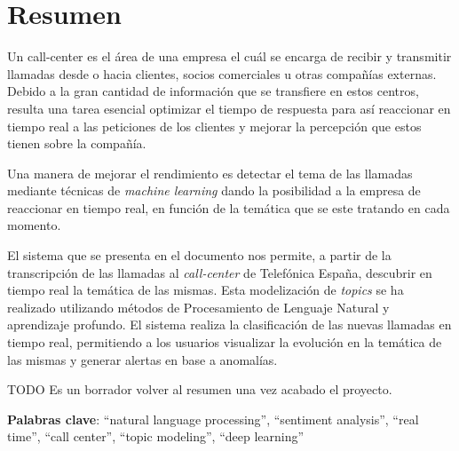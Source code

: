 




\chapter*{Resumen}


Un call-center es el área de una empresa el cuál se encarga de recibir y transmitir llamadas desde o hacia clientes, socios comerciales u otras compañías externas. Debido a la gran cantidad de información que se transfiere en estos centros, resulta una tarea esencial optimizar el tiempo de respuesta para así reaccionar en tiempo real a las peticiones de los clientes y mejorar la percepción que estos tienen sobre la compañía. 

Una manera de mejorar el rendimiento es detectar el tema de las llamadas  mediante técnicas de \textit{machine learning} dando la posibilidad a la empresa de reaccionar en tiempo real, en función de la temática que se este tratando en cada momento. 




El sistema que se presenta en el documento nos permite, a partir de la transcripción de las llamadas al \textit{call-center} de Telefónica España, descubrir en tiempo real la temática de las mismas. Esta modelización de \textit{topics} se ha realizado utilizando métodos de Procesamiento de Lenguaje Natural y aprendizaje profundo. El sistema realiza la clasificación de las nuevas llamadas en tiempo real, permitiendo a los usuarios visualizar la evolución en la temática de las mismas y generar alertas en base a anomalías.  


TODO Es un borrador volver al  resumen una vez acabado el proyecto.
\onehalfspacing

\vspace{1.5cm}

\textbf{Palabras clave}: ``natural language processing'', ``sentiment analysis'', ``real time'', ``call center'', ``topic modeling'', ``deep learning''
